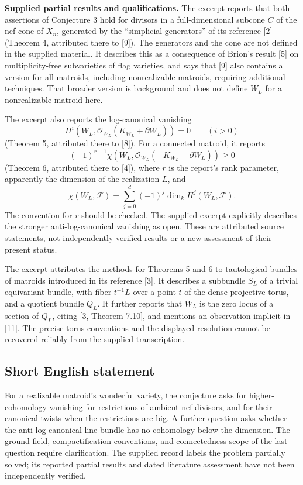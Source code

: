 \documentclass[11pt]{article}
\begin{document}
\textbf{Supplied partial results and qualifications.} The excerpt reports that both assertions of Conjecture 3 hold for divisors in a full-dimensional subcone \(C\) of the nef cone of \(X_n\), generated by the ``simplicial generators'' of its reference [2] (Theorem 4, attributed there to [9]). The generators and the cone are not defined in the supplied material. It describes this as a consequence of Brion's result [5] on multiplicity-free subvarieties of flag varieties, and says that [9] also contains a version for all matroids, including nonrealizable matroids, requiring additional techniques. That broader version is background and does not define \(W_L\) for a nonrealizable matroid here.

The excerpt also reports the log-canonical vanishing
\[
H^i\!\left(W_L,\mathcal O_{W_L}(K_{W_L}+\partial W_L)\right)=0
\qquad(i>0)
\]
(Theorem 5, attributed there to [8]). For a connected matroid, it reports
\[
(-1)^{r-1}\chi\!\left(W_L,\mathcal O_{W_L}(-K_{W_L}-\partial W_L)\right)\geq 0
\]
(Theorem 6, attributed there to [4]), where \(r\) is the report's rank parameter, apparently the dimension of the realization \(L\), and
\[
\chi(W_L,\mathcal F)=\sum_{j=0}^{d}(-1)^j\dim_k H^j(W_L,\mathcal F).
\]
The convention for \(r\) should be checked. The supplied excerpt explicitly describes the stronger anti-log-canonical vanishing as open. These are attributed source statements, not independently verified results or a new assessment of their present status.

The excerpt attributes the methods for Theorems 5 and 6 to tautological bundles of matroids introduced in its reference [3]. It describes a subbundle \(S_L\) of a trivial equivariant bundle, with fiber \(t^{-1}L\) over a point \(t\) of the dense projective torus, and a quotient bundle \(Q_L\). It further reports that \(W_L\) is the zero locus of a section of \(Q_L\), citing [3, Theorem 7.10], and mentions an observation implicit in [11]. The precise torus conventions and the displayed resolution cannot be recovered reliably from the supplied transcription.
\subsection{Short English statement}
For a realizable matroid's wonderful variety, the conjecture asks for higher-cohomology vanishing for restrictions of ambient nef divisors, and for their canonical twists when the restrictions are big. A further question asks whether the anti-log-canonical line bundle has no cohomology below the dimension. The ground field, compactification conventions, and connectedness scope of the last question require clarification. The supplied record labels the problem partially solved; its reported partial results and dated literature assessment have not been independently verified.
\end{document}
